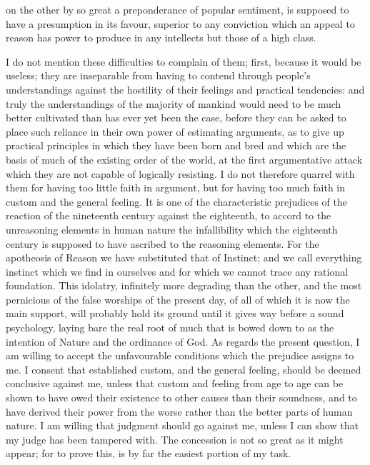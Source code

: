 \documentclass[12pt]{report}
\begin{document}
on the other by so great a preponderance of popular sentiment, is supposed to have a presumption in its favour, superior to any conviction which an appeal to reason has power to produce in any intellects but those of a high class.

I do not mention these difficulties to complain of them; first, because it would be useless; they are inseparable from having to contend through people's understandings against the hostility of their feelings and practical tendencies: and truly the understandings of the majority of mankind would need to be much better cultivated than has ever yet been the case, before they can be asked to place such reliance in their own power of estimating arguments, as to give up practical principles in which they have been born and bred and which are the basis of much of the existing order of the world, at the first argumentative attack which they are not capable of logically resisting. I do not therefore quarrel with them for having too little faith in argument, but for having too much faith in custom and the general feeling. It is one of the characteristic prejudices of the reaction of the nineteenth century against the eighteenth, to accord to the unreasoning elements in human nature the infallibility which the eighteenth century is supposed to have ascribed to the reasoning elements. For the apotheosis of Reason we have substituted that of Instinct; and we call everything instinct which we find in ourselves and for which we cannot trace any rational foundation. This idolatry, infinitely more degrading than the other, and the most pernicious of the false worships of the present day, of all of which it is now the main support, will probably hold its ground until it gives way before a sound psychology, laying bare the real root of much that is bowed down to as the intention of Nature and the ordinance of God. As regards the present question, I am willing to accept the unfavourable conditions which the prejudice assigns to me. I consent that established custom, and the general feeling, should be deemed conclusive against me, unless that custom and feeling from age to age can be shown to have owed their existence to other causes than their soundness, and to have derived their power from the worse rather than the better parts of human nature. I am willing that judgment should go against me, unless I can show that my judge has been tampered with. The concession is not so great as it might appear; for to prove this, is by far the easiest portion of my task.
\end{document}
